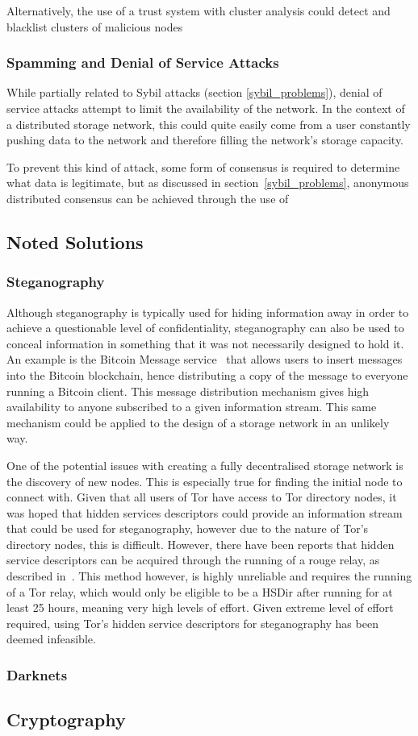 			Alternatively, the use of a trust system with cluster analysis could detect and blacklist clusters of malicious nodes
		\subsubsection*{Spamming and Denial of Service Attacks}
			While partially related to Sybil attacks (section \ref{sybil_problems}), denial of service attacks attempt to limit the availability of the network. In the context of a distributed storage network, this could quite easily come from a user constantly pushing data to the network and therefore filling the network's storage capacity.
			
			To prevent this kind of attack, some form of consensus is required to determine what data is legitimate, but as discussed in section~\ref{sybil_problems}, anonymous distributed consensus can be achieved through the use of 
	\subsection{Noted Solutions}
		\subsubsection*{Steganography}
				Although steganography is typically used for hiding information away in order to achieve a questionable level of confidentiality, steganography can also be used to conceal information in something that it was not necessarily designed to hold it. An example is the Bitcoin Message service~\cite{btcmsg} that allows users to insert messages into the Bitcoin blockchain, hence distributing a copy of the message to everyone running a Bitcoin client. This message distribution mechanism gives high availability to anyone subscribed to a given information stream. This same mechanism could be applied to the design of a storage network in an unlikely way.
				
				One of the potential issues with creating a fully decentralised storage network is the discovery of new nodes. This is especially true for finding the initial node to connect with. Given that all users of Tor have access to Tor directory nodes, it was hoped that hidden services descriptors could provide an information stream that could be used for steganography, however due to the nature of Tor's directory nodes, this is difficult. However, there have been reports that hidden service descriptors can be acquired through the running of a rouge relay, as described in~\cite{crawl}. This method however, is highly unreliable and requires the running of a Tor relay, which would only be eligible to be a HSDir after running for at least 25 hours, meaning very high levels of effort. Given extreme level of effort required, using Tor's hidden service descriptors for steganography has been deemed infeasible.
		\subsubsection*{Darknets}
	\subsection{Cryptography}
